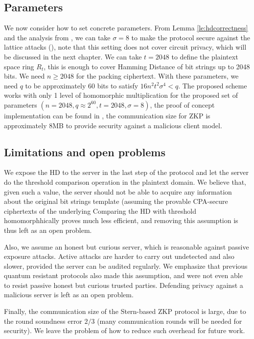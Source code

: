 \subsection{Parameters}
\label{sec:parameters}
We now consider how to set concrete parameters. From Lemma
\ref{le:hdcorrectness} and the analysis from \cite{naehrig2011can}, we can take
\(\sigma = 8\) to make the protocol secure against the lattice attacks
(\cite{micciancio2008lattice}), note that this setting does not cover circuit
privacy, which will be discussed in the next chapter. We can take \(t = 2048\)
to define the plaintext space ring \(R_{t}\), this is enough to cover Hamming
Distance of bit strings up to 2048 bits. We need \(n \geq 2048\) for the packing
ciphertext. With these parameters, we need \(q\) to be approximately 60 bits to
satisfy \(16n^{2}t^{2}\sigma^{4} < q\).  The proposed scheme works with only 1
level of homomorphic multiplication for the proposed set of parameters
$(n = 2048, q \approx 2^{60}, t = 2048, \sigma = 8)$, the proof of concept
implementation can be found in \cite{rimrimrq38:online}, the communication size for
ZKP is approximately 8MB to provide security against a malicious client model.

\subsection{Limitations and open problems}
\label{sec:limitations}
We expose the HD to the server in the last step of the protocol and let the server do the threshold comparison
operation in the plaintext domain. We believe that, given such a value, the server should not be able to acquire any
information about the original bit strings template (assuming the provable CPA-secure ciphertexts of the underlying
Comparing the HD with threshold
homomorphhically proves much less efficient, and removing this assumption is thus left as an open problem.

Also, we assume an honest but curious server, which is reasonable against passive exposure attacks. Active attacks are
harder to carry out undetected and also slower, provided the server can be audited regularly. We emphasize that previous quantum
resistant protocols also made this assumption, and were not even able to resist passive honest but curious trusted
parties. Defending privacy against a malicious server is left as an open problem.

Finally, the communication size of the Stern-based ZKP protocol is large, due to the round soundness error \(2/3\) (many
communication rounds will be needed for security). We leave the problem of how to reduce such overhead for future work.

